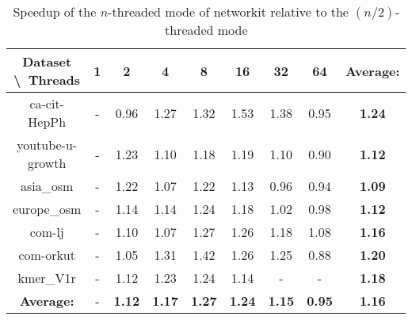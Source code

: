 \begin{table}[H]
	\centering
	\begin{tabular}{|c|c|c|c|c|c|c|c|c|}
		\hline
		Dataset \textbackslash\ Threads& 1 & 2 & 4 & 8 & 16 & 32 & 64 & \textbf{Average:} \\
		\hline
		ca-cit-HepPh & - & 0.96 & 1.27 & 1.32 & 1.53 & 1.38 & 0.95 & \textbf{1.24} \\
		\hline
		youtube-u-growth & - & 1.23 & 1.10 & 1.18 & 1.19 & 1.10 & 0.90 & \textbf{1.12} \\
		\hline
		asia\_osm & - & 1.22 & 1.07 & 1.22 & 1.13 & 0.96 & 0.94 & \textbf{1.09} \\
		\hline
		europe\_osm & - & 1.14 & 1.14 & 1.24 & 1.18 & 1.02 & 0.98 & \textbf{1.12} \\
		\hline
		com-lj & - & 1.10 & 1.07 & 1.27 & 1.26 & 1.18 & 1.08 & \textbf{1.16} \\
		\hline
		com-orkut & - & 1.05 & 1.31 & 1.42 & 1.26 & 1.25 & 0.88 & \textbf{1.20} \\
		\hline
		kmer\_V1r & - & 1.12 & 1.23 & 1.24 & 1.14 & - & - & \textbf{1.18} \\
		\hline
		\textbf{Average:} & - & \textbf{1.12} & \textbf{1.17} & \textbf{1.27} & \textbf{1.24} & \textbf{1.15} & \textbf{0.95} & \textbf{1.16} \\
		\hline
	\end{tabular}
\caption{Speedup of the $n$-threaded mode of networkit relative to the $(n/2)$-threaded mode}
\label{T:relative speedup for networkit}
\end{table}